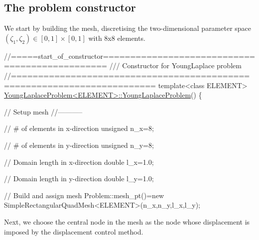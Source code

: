  

\hypertarget{index_constr}{}\subsection{The problem constructor}\label{index_constr}
We start by building the mesh, discretising the two-\/dimensional parameter space $ (\zeta_1,\zeta_2) \in [0,1] \times [0,1]$ with 8x8 elements.


\begin{DoxyCodeInclude}


\textcolor{comment}{//=====start\_of\_constructor===============================================}\textcolor{comment}{}
\textcolor{comment}{/// Constructor for YoungLaplace problem}
\textcolor{comment}{}\textcolor{comment}{//========================================================================}
\textcolor{keyword}{template}<\textcolor{keyword}{class} ELEMENT>
\hyperlink{classYoungLaplaceProblem_a4ea552f351994849e9ab597ef2da797a}{YoungLaplaceProblem<ELEMENT>::YoungLaplaceProblem}()
\{ 

 \textcolor{comment}{// Setup mesh}
 \textcolor{comment}{//-----------}

 \textcolor{comment}{// # of elements in x-direction}
 \textcolor{keywordtype}{unsigned} n\_x=8;

 \textcolor{comment}{// # of elements in y-direction}
 \textcolor{keywordtype}{unsigned} n\_y=8;

 \textcolor{comment}{// Domain length in x-direction}
 \textcolor{keywordtype}{double} l\_x=1.0;

 \textcolor{comment}{// Domain length in y-direction}
 \textcolor{keywordtype}{double} l\_y=1.0;
 
 \textcolor{comment}{// Build and assign mesh}
 Problem::mesh\_pt()=\textcolor{keyword}{new} SimpleRectangularQuadMesh<ELEMENT>(n\_x,n\_y,l\_x,l\_y);

\end{DoxyCodeInclude}


Next, we choose the central node in the mesh as the node whose displacement is imposed by the displacement control method.


